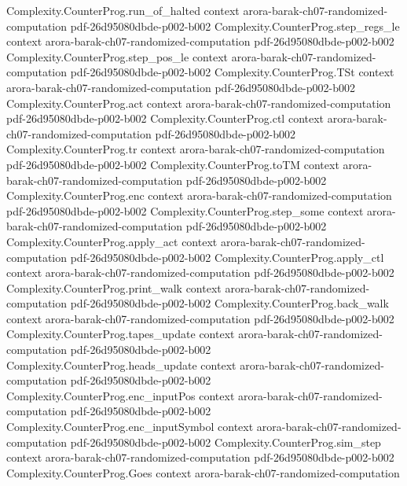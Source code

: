 \begin{theorem}
  {Complexity.CounterProg.run_of_halted}
  {context}
  {arora-barak-ch07-randomized-computation}
  {pdf-26d95080dbde-p002-b002}
\proofstep
  {Complexity.CounterProg.step_regs_le}
  {context}
  {arora-barak-ch07-randomized-computation}
  {pdf-26d95080dbde-p002-b002}
\proofstep
  {Complexity.CounterProg.step_pos_le}
  {context}
  {arora-barak-ch07-randomized-computation}
  {pdf-26d95080dbde-p002-b002}
\proofstep
  {Complexity.CounterProg.TSt}
  {context}
  {arora-barak-ch07-randomized-computation}
  {pdf-26d95080dbde-p002-b002}
\proofstep
  {Complexity.CounterProg.act}
  {context}
  {arora-barak-ch07-randomized-computation}
  {pdf-26d95080dbde-p002-b002}
\proofstep
  {Complexity.CounterProg.ctl}
  {context}
  {arora-barak-ch07-randomized-computation}
  {pdf-26d95080dbde-p002-b002}
\proofstep
  {Complexity.CounterProg.tr}
  {context}
  {arora-barak-ch07-randomized-computation}
  {pdf-26d95080dbde-p002-b002}
\proofstep
  {Complexity.CounterProg.toTM}
  {context}
  {arora-barak-ch07-randomized-computation}
  {pdf-26d95080dbde-p002-b002}
\proofstep
  {Complexity.CounterProg.enc}
  {context}
  {arora-barak-ch07-randomized-computation}
  {pdf-26d95080dbde-p002-b002}
\proofstep
  {Complexity.CounterProg.step_some}
  {context}
  {arora-barak-ch07-randomized-computation}
  {pdf-26d95080dbde-p002-b002}
\proofstep
  {Complexity.CounterProg.apply_act}
  {context}
  {arora-barak-ch07-randomized-computation}
  {pdf-26d95080dbde-p002-b002}
\proofstep
  {Complexity.CounterProg.apply_ctl}
  {context}
  {arora-barak-ch07-randomized-computation}
  {pdf-26d95080dbde-p002-b002}
\proofstep
  {Complexity.CounterProg.print_walk}
  {context}
  {arora-barak-ch07-randomized-computation}
  {pdf-26d95080dbde-p002-b002}
\proofstep
  {Complexity.CounterProg.back_walk}
  {context}
  {arora-barak-ch07-randomized-computation}
  {pdf-26d95080dbde-p002-b002}
\proofstep
  {Complexity.CounterProg.tapes_update}
  {context}
  {arora-barak-ch07-randomized-computation}
  {pdf-26d95080dbde-p002-b002}
\proofstep
  {Complexity.CounterProg.heads_update}
  {context}
  {arora-barak-ch07-randomized-computation}
  {pdf-26d95080dbde-p002-b002}
\proofstep
  {Complexity.CounterProg.enc_inputPos}
  {context}
  {arora-barak-ch07-randomized-computation}
  {pdf-26d95080dbde-p002-b002}
\proofstep
  {Complexity.CounterProg.enc_inputSymbol}
  {context}
  {arora-barak-ch07-randomized-computation}
  {pdf-26d95080dbde-p002-b002}
\proofstep
  {Complexity.CounterProg.sim_step}
  {context}
  {arora-barak-ch07-randomized-computation}
  {pdf-26d95080dbde-p002-b002}
\proofstep
  {Complexity.CounterProg.Goes}
  {context}
  {arora-barak-ch07-randomized-computation}

\end{theorem}
